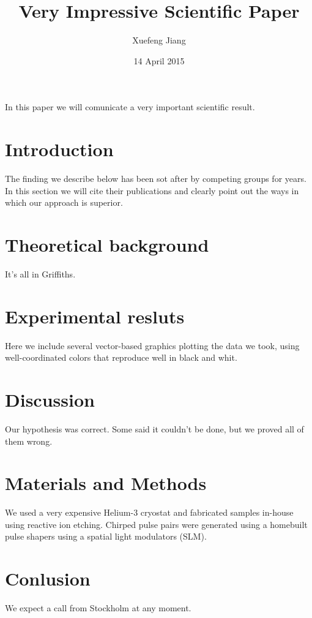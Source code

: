 \documentclass[11pt]{amsart}
\title{Very Impressive Scientific Paper}
\author{Xuefeng Jiang}
\date{14 April 2015}
\begin{document}
\maketitle

In this paper we will comunicate a very important scientific result.

\section{Introduction}

The finding we describe below has been sot after by competing groups
for years. In this section we will cite their publications and clearly
point out the ways in which our approach is superior.

\section{Theoretical background}

It's all in Griffiths.

\section{Experimental resluts}

Here we include several vector-based graphics plotting the data we
took, using well-coordinated colors that reproduce well in black and
whit.

\section{Discussion}

Our hypothesis was correct. Some said it couldn't be done, but we
proved all of them wrong.

\section{Materials and Methods}

We used a very expensive Helium-3 cryostat and fabricated samples
in-house using reactive ion etching. Chirped pulse pairs were
generated using a homebuilt pulse shapers using a spatial light
modulators (SLM).

\section{Conlusion}

We expect a call from Stockholm at any moment.
\end{document}
